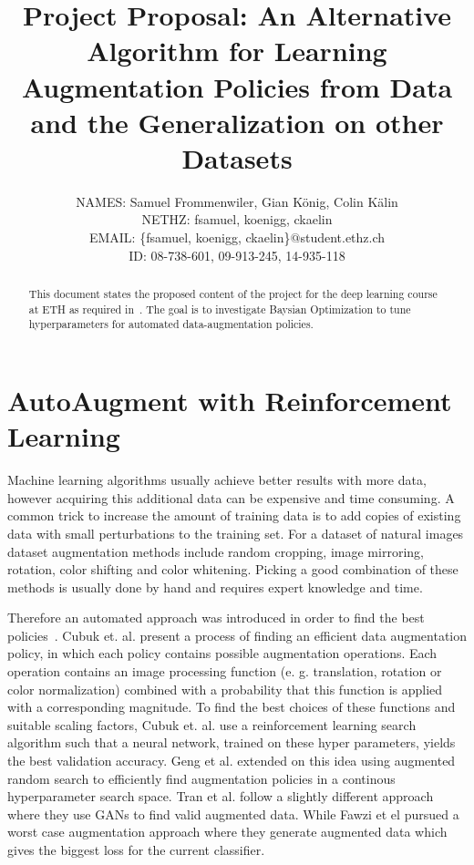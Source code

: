 \documentclass[10pt,twocolumn,letterpaper]{article}
\begin{document}
\title{Project Proposal: An Alternative Algorithm for Learning Augmentation Policies from Data and the Generalization on other Datasets}

\author{
    	\small{NAMES: Samuel Frommenwiler, Gian K\"onig, Colin K\"alin} \\
   	\small{NETHZ: fsamuel, koenigg, ckaelin}\\
	\small{EMAIL: \{fsamuel, koenigg, ckaelin\}$@$student.ethz.ch}\\
    	\small{ID: 08-738-601, 09-913-245, 14-935-118}
}

\maketitle

\begin{abstract}
   This document states the proposed content of the project for the deep learning course at ETH as required in~\cite{DL18}. The goal is to investigate Baysian Optimization to tune hyperparameters for automated data-augmentation policies.
\end{abstract}

\section{AutoAugment with Reinforcement Learning}
Machine learning algorithms usually achieve better results with more data, however acquiring this additional data can be expensive and time consuming.  A common trick to increase the amount of training data is to add copies of existing data with small perturbations to the training set. For a dataset of natural images dataset augmentation methods include random cropping, image mirroring, rotation, color shifting and color whitening. Picking a good combination of these methods is usually done by hand and requires expert knowledge and time.
\par
  Therefore an automated approach was introduced in order to find the best policies~\cite{Ekin}. Cubuk et. al. present a process of finding an efficient data augmentation policy, in which each policy contains possible augmentation operations. Each operation contains an image processing function (e. g. translation, rotation or color normalization) combined with a probability that this function is applied with a corresponding magnitude. To find the best choices of these functions and suitable scaling factors, Cubuk et. al. use a reinforcement learning search algorithm such that a neural network, trained on these hyper parameters, yields the best validation accuracy.
  Geng et al. \cite{DBLP:journals/corr/abs-1811-04768} extended on this idea using augmented random search to efficiently find augmentation policies in a continous hyperparameter search space.
  Tran et al. \cite{DBLP:journals/corr/abs-1710-10564} follow a slightly different approach where they use GANs to find valid augmented data. While Fawzi et el \cite{Fawzi} pursued a worst case augmentation approach where they generate augmented data which gives the biggest loss for the current classifier.
\end{document}
